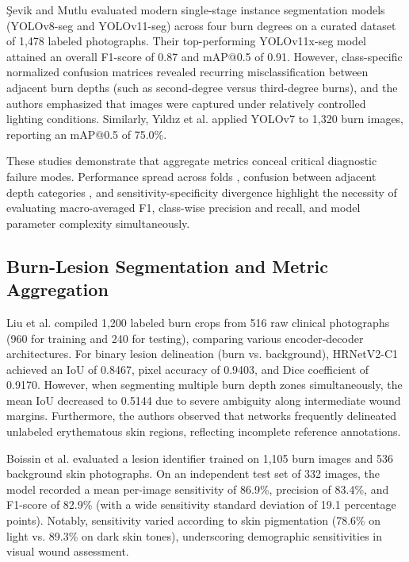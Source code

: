 \documentclass[11pt,a4paper]{article}
\begin{document}
Şevik and Mutlu \cite{sevik2026} evaluated modern single-stage instance segmentation models (YOLOv8-seg and YOLOv11-seg) across four burn degrees on a curated dataset of 1,478 labeled photographs. Their top-performing YOLOv11x-seg model attained an overall F1-score of 0.87 and mAP@0.5 of 0.91. However, class-specific normalized confusion matrices revealed recurring misclassification between adjacent burn depths (such as second-degree versus third-degree burns), and the authors emphasized that images were captured under relatively controlled lighting conditions. Similarly, Yıldız et al. \cite{yildiz2024} applied YOLOv7 to 1,320 burn images, reporting an mAP@0.5 of 75.0\%.

These studies demonstrate that aggregate metrics conceal critical diagnostic failure modes. Performance spread across folds \cite{cirillo2019}, confusion between adjacent depth categories \cite{sevik2026}, and sensitivity-specificity divergence \cite{boissin2023} highlight the necessity of evaluating macro-averaged F1, class-wise precision and recall, and model parameter complexity simultaneously.

\subsection{Burn-Lesion Segmentation and Metric Aggregation}

Liu et al. \cite{liu2021} compiled 1,200 labeled burn crops from 516 raw clinical photographs (960 for training and 240 for testing), comparing various encoder-decoder architectures. For binary lesion delineation (burn vs. background), HRNetV2-C1 achieved an IoU of 0.8467, pixel accuracy of 0.9403, and Dice coefficient of 0.9170. However, when segmenting multiple burn depth zones simultaneously, the mean IoU decreased to 0.5144 due to severe ambiguity along intermediate wound margins. Furthermore, the authors observed that networks frequently delineated unlabeled erythematous skin regions, reflecting incomplete reference annotations.

Boissin et al. \cite{boissin2023} evaluated a lesion identifier trained on 1,105 burn images and 536 background skin photographs. On an independent test set of 332 images, the model recorded a mean per-image sensitivity of 86.9\%, precision of 83.4\%, and F1-score of 82.9\% (with a wide sensitivity standard deviation of 19.1 percentage points). Notably, sensitivity varied according to skin pigmentation (78.6\% on light vs. 89.3\% on dark skin tones), underscoring demographic sensitivities in visual wound assessment.
\end{document}

